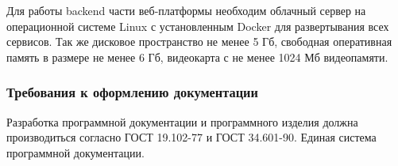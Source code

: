 Для работы backend части веб-платформы необходим облачный сервер на операционной системе Linux с установленным Docker для развертывания всех сервисов. Так же дисковое пространство не менее 5 Гб, свободная оперативная память в размере не менее 6 Гб, видеокарта с не менее 1024 Мб видеопамяти.

\subsubsection{Требования к оформлению документации}

Разработка программной документации и программного изделия должна производиться согласно ГОСТ 19.102-77 и ГОСТ 34.601-90. Единая система программной документации.
